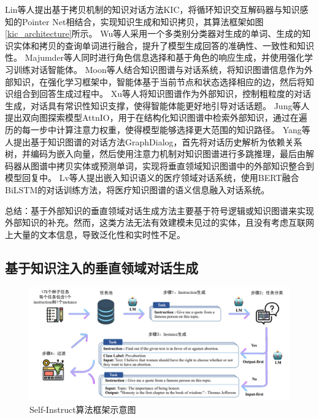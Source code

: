 Lin等人\cite{DBLP:conf/acl/LinJHWC20}提出基于拷贝机制的知识对话方法KIC，将循环知识交互解码器与知识感知的Pointer Net相结合，实现知识生成和知识拷贝，其算法框架如图\ref{kic_architecture}所示。
Wu等人\cite{DBLP:conf/acl/WuLZZW20}采用一个多类别分类器对生成的单词、生成的知识实体和拷贝的查询单词进行融合，提升了模型生成回答的准确性、一致性和知识性。
Majumder等人\cite{DBLP:conf/emnlp/MajumderJBM20}同时进行角色信息选择和基于角色的响应生成，并使用强化学习训练对话智能体。
Moon等人\cite{DBLP:conf/acl/MoonSKS19}结合知识图谱与对话系统，将知识图谱信息作为外部知识，在强化学习框架中，智能体基于当前节点和状态选择相应的边，然后将知识组合到回答生成过程中。
Xu等人\cite{DBLP:conf/acl/XuWNWCL20}将知识图谱作为外部知识，控制粗粒度的对话生成，对话具有常识性知识支撑，使得智能体能更好地引导对话话题。
Jung等人\cite{DBLP:conf/emnlp/JungSL20}提出双向图探索模型AttnIO，用于在结构化知识图谱中检索外部知识，通过在遍历的每一步中计算注意力权重，使得模型能够选择更大范围的知识路径。
Yang等人\cite{DBLP:conf/emnlp/YangZE20}提出基于知识图谱的对话方法GraphDialog，首先将对话历史解析为依赖关系树，并编码为嵌入向量，然后使用注意力机制对知识图谱进行多跳推理，最后由解码器从图谱中拷贝实体或预测单词，实现将垂直领域知识图谱中的外部知识整合到模型回复中。
Lv等人\cite{SJSJ202312037}提出嵌入知识语义的医疗领域对话系统，使用BERT融合BiLSTM的对话训练方法，将医疗知识图谱的语义信息融入对话系统。

总结：基于外部知识的垂直领域对话生成方法主要基于符号逻辑或知识图谱来实现外部知识的补充。然而，这类方法无法有效建模未见过的实体，且没有考虑互联网上大量的文本信息，导致泛化性和实时性不足。

\subsection{基于知识注入的垂直领域对话生成}

\begin{figure}[htbp]
	\centering
	\includegraphics[scale=0.5]{Fig/self-instruct_architecture.png}
	\caption{\label{self_instruct_architecture}Self-Instruct算法框架示意图\cite{DBLP:conf/acl/WangKMLSKH23}}
\end{figure}


